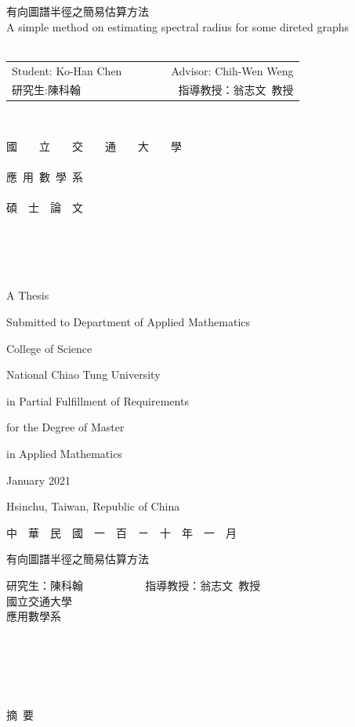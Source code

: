 \documentclass{article}
\renewcommand{\baselinestretch}{1.5} %
\theoremstyle{plain}
\theoremstyle{definition}
\begin{document}
\renewcommand{\baselinestretch}{2} %
\thispagestyle{empty}
\begin{center}
{
\Large
有向圖譜半徑之簡易估算方法\\
A simple method on estimating spectral radius for some direted graphs\\~\\
\begin{tabular}{lccr}
Student: Ko-Han Chen  &&~~~& Advisor: Chih-Wen Weng\\
研究生:陳科翰　 &&~~~& 指導教授：翁志文~教授
\end{tabular}
}~\\

\bigskip

\renewcommand{\baselinestretch}{1} %

{ \LARGE 國~~~~立~~~~交~~~~通~~~~大~~~~學}\\~\\
{ \LARGE 應~用~數~學~系}\\~\\
{ \LARGE 碩~~士~~論~~文}\\~\\~\\~\\~\\
\renewcommand{\baselinestretch}{1} %
{ \large A Thesis

Submitted to Department of Applied Mathematics

College of Science

National Chiao Tung University

in Partial Fulfillment of Requirements

for the Degree of Master

in Applied Mathematics
\bigskip \medskip

January 2021

Hsinchu, Taiwan, Republic of China \bigskip \medskip

 中~~華~~民~~國~~一~~百~~ㄧ~~十~~年~~一~~月 }
\end{center}
\pagebreak

\label{abstract}

\begin{center}
{  \LARGE
有向圖譜半徑之簡易估算方法
\bigskip\bigskip\bigskip

研究生：陳科翰  ~~~~~~~~~~ 指導教授：翁志文~教授 \\
國立交通大學  \\
\bigskip
應用數學系
\bigskip\bigskip\bigskip\bigskip
} \\~\\~\\~\\
{\large 摘~要}
\end{center}
 \bigskip
\end{document}

